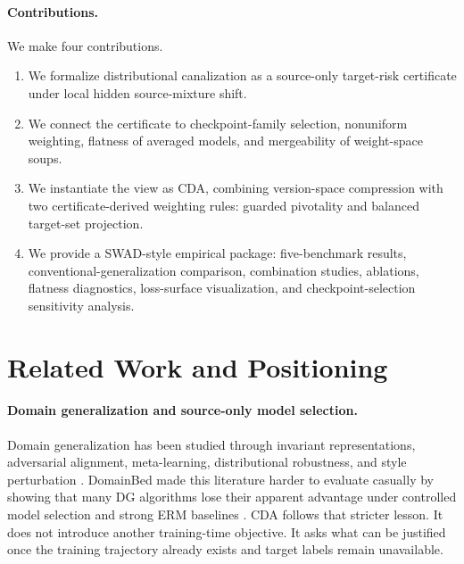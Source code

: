 \documentclass{article}
\theoremstyle{definition}
\newcommand{\cda}{\textup{\textsc{CDA}}}
\begin{document}
\paragraph{Contributions.}
We make four contributions.
\begin{enumerate}[leftmargin=1.4em]
    \item We formalize distributional canalization as a source-only target-risk certificate under local hidden source-mixture shift.
    \item We connect the certificate to checkpoint-family selection, nonuniform weighting, flatness of averaged models, and mergeability of weight-space soups.
    \item We instantiate the view as \cda{}, combining version-space compression with two certificate-derived weighting rules: guarded pivotality and balanced target-set projection.
    \item We provide a SWAD-style empirical package: five-benchmark results, conventional-generalization comparison, combination studies, ablations, flatness diagnostics, loss-surface visualization, and checkpoint-selection sensitivity analysis.
\end{enumerate}

\section{Related Work and Positioning}
\label{sec:related}

\paragraph{Domain generalization and source-only model selection.}
Domain generalization has been studied through invariant representations, adversarial alignment, meta-learning, distributional robustness, and style perturbation \citep{muandet2013domain,ganin2016domain,li2018learning,arjovsky2019invariant,Sagawa2020GroupDRO,zhou2021domain}. DomainBed made this literature harder to evaluate casually by showing that many DG algorithms lose their apparent advantage under controlled model selection and strong ERM baselines \citep{gulrajani2021domainbed}. CDA follows that stricter lesson. It does not introduce another training-time objective. It asks what can be justified once the training trajectory already exists and target labels remain unavailable.
\end{document}
